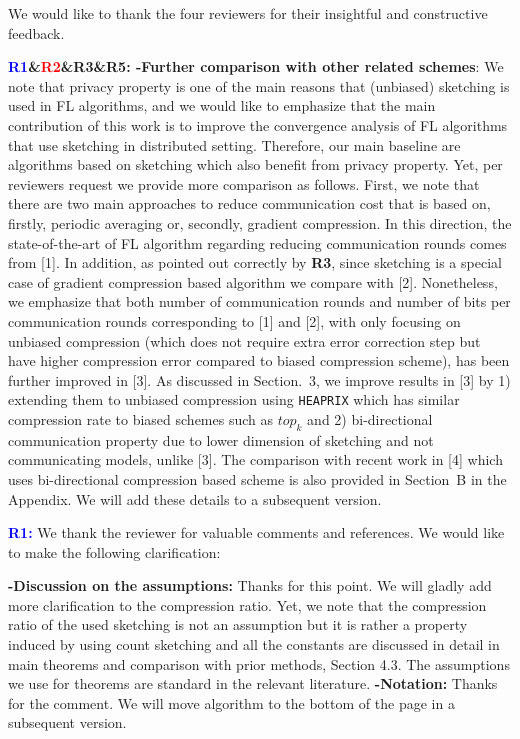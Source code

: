 \documentclass{article}
\begin{document}
We would like to thank the four reviewers for their insightful and constructive feedback. 

\textbf{\textcolor{blue}{R1}\&\textcolor{red}{R2}\&\textbf{\color{yellow!50!black}R3}\&\textbf{\textcolor{green!50!black}{R5:}} -Further comparison with other related schemes}: We note that privacy property is one of the main reasons that (unbiased) sketching is used in FL algorithms, and we would like to emphasize that the main contribution of this work is to improve the convergence analysis of FL algorithms that use sketching in distributed setting. 
Therefore, our main baseline are algorithms based on sketching which also {benefit from privacy property}. 
Yet, per reviewers request we provide more comparison as follows. 
First, we note that there are two main approaches to reduce communication cost that is based on, firstly, periodic averaging or, secondly, gradient compression. In this direction, the state-of-the-art of FL algorithm regarding reducing communication rounds comes from [1]. 
In addition, as pointed out correctly by \textbf{\textcolor{yellow!50!black}{R3}}, since sketching is a special case of gradient compression based algorithm we compare with [2]. 
Nonetheless, we emphasize that both number of communication rounds and number of bits per communication rounds corresponding to [1] and [2], \textcolor{red!50!black}{with only focusing on unbiased compression (which does not require extra error correction step but have higher compression error compared to biased compression scheme)}, has been further improved in [3]. 
As discussed in Section.~3, we improve results in [3] by \textcolor{red!50!black}{1)  extending them to unbiased compression using \texttt{HEAPRIX} which has similar compression rate to biased schemes such as $top_k$} and \textcolor{red!50!black}{2)  bi-directional communication property due to lower dimension of sketching and not communicating models, unlike [3]}.  
The comparison with recent work in [4] which uses bi-directional compression based scheme is also provided in Section~B in the Appendix. We will add these details to a subsequent version.




\textbf{\textcolor{blue}{R1:}} We thank the reviewer for valuable comments and references. We would like to make the following clarification:\vspace{-1.5pt} 


\textbf{-Discussion on the assumptions:} Thanks for this point. We will gladly add more clarification to the compression ratio. Yet, we note that the compression ratio of the used sketching is not an assumption but it is rather a property induced by using count sketching and all the constants are discussed in detail in main theorems and comparison with prior methods, Section 4.3. 
The assumptions we use for theorems are standard in the relevant literature. 
\textbf{-Notation:} Thanks for the comment. We will move algorithm to the bottom of the page in a subsequent version.
\end{document}
